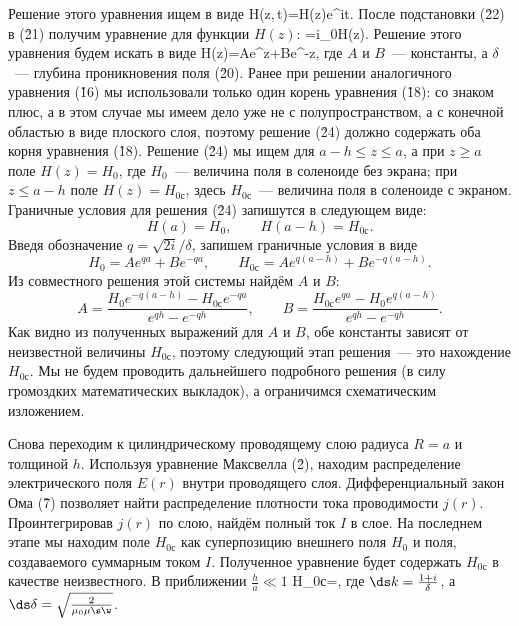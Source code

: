 
\noindent Решение этого уравнения ищем в виде
H(z,\,t)=H(z)e^{i\w t}.
\ee
После подстановки (\r{22}) в (\r{21}) получим уравнение для функции $H(z)$:
=i\mu_0\mu\s\w H(z).
\ee
Решение этого уравнения будем искать в виде
H(z)=Ae^{z}+Be^{-z},
\ee
где $A$ и $B$~--- константы, а $\delta$~--- глубина проникновения поля (\r{20}). Ранее при решении аналогичного
уравнения (\r{16}) мы использовали только один корень уравнения (\r{18}): со знаком плюс, а в этом случае мы имеем дело
уже не с полупространством, а с конечной областью в виде плоского слоя, поэтому решение (\r{24}) должно содержать оба
корня уравнения (\r{18}). Решение (\r{24}) мы ищем для $a-h\le z\le a$, а при $z\ge a$ поле $H(z)=H_0$, где $H_0$~---
величина поля в соленоиде без экрана; при $z\le a-h$ поле $H(z)=H_{0с}$, здесь $H_{0с}$~--- величина поля в соленоиде с
экраном. Граничные условия для решения (\r{24}) запишутся в следующем виде:
\[
H(a)=H_0,\qquad H(a-h)=H_{0с}.
\]
Введя обозначение $q=\sqrt{2i}/\delta$, запишем граничные условия в виде
\[
H_0=Ae^{qa}+Be^{-qa},\qquad H_{0с}=Ae^{q(a-h)}+Be^{-q(a-h)}.
\]
Из совместного решения этой системы найдём $A$ и $B$:
\[
A=\frac{H_0e^{-q(a-h)}-H_{0с}e^{-qa}}{e^{qh}-e^{-qh}},\qquad B=\frac{H_{0с}e^{qa}-H_0e^{q(a-h)}}{e^{qh}-e^{-qh}}.
\]
Как видно из полученных выражений для $A$ и $B$, обе константы зависят от неизвестной величины $H_{0с}$, поэтому
следующий этап решения~--- это нахождение $H_{0с}$. Мы не будем проводить дальнейшего подробного решения (в силу
громоздких математических выкладок), а ограничимся схематическим изложением.

Снова переходим к цилиндрическому проводящему слою радиуса $R=a$ и толщиной $h$. Используя уравнение Максвелла (\r2),
находим распределение электрического поля $E(r)$ внутри проводящего слоя. Дифференциальный закон Ома (\r7) позволяет
найти распределение плотности тока проводимости $j(r)$. Проинтегрировав $j(r)$ по слою, найдём полный ток $I$ в слое. На
последнем этапе мы находим поле $H_{0с}$ как суперпозицию внешнего поля $H_0$ и поля, создаваемого суммарным током $I$.
Полученное уравнение будет содержать $H_{0с}$ в качестве неизвестного. В приближении $\frac{h}{a}\ll 1$
H_{0с}=,
\ee
где $\ds k=\frac{1+i}{\delta}$, а $\ds\delta=\sqrt{\frac{2}{\mu_0\mu\s\w}}$.

